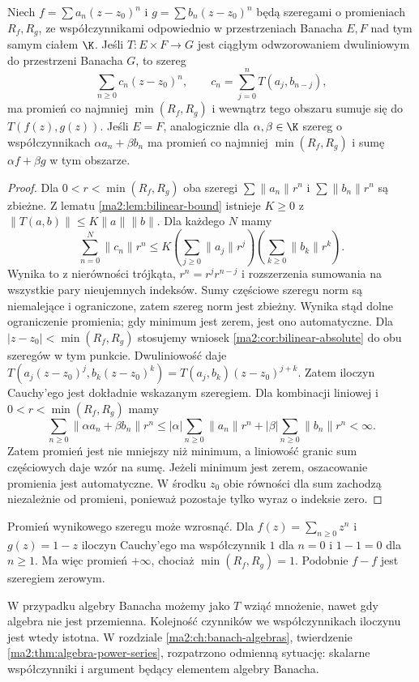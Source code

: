 \begin{twierdzenie}
\label{ma2:thm:power-algebra}
Niech $f=\sum a_n(z-z_0)^n$ i
$g=\sum b_n(z-z_0)^n$ będą szeregami
o promieniach $R_f,R_g$, ze współczynnikami
odpowiednio w przestrzeniach Banacha $E,F$
nad tym samym ciałem $\K$.
Jeśli $T:E\times F\to G$ jest ciągłym
odwzorowaniem dwuliniowym do przestrzeni
Banacha $G$, to szereg
\[
 \sum_{n\ge0}c_n(z-z_0)^n,\qquad
 c_n=\sum_{j=0}^n T(a_j,b_{n-j}),
\]
ma promień co najmniej $\min(R_f,R_g)$
i wewnątrz tego obszaru sumuje się do $T(f(z),g(z))$.
Jeśli $E=F$, analogicznie dla $\alpha,\beta\in\K$
szereg o współczynnikach $\alpha a_n+\beta b_n$
ma promień co najmniej $\min(R_f,R_g)$
i sumę $\alpha f+\beta g$ w tym obszarze.
\end{twierdzenie}
\begin{proof}
Dla $0<r<\min(R_f,R_g)$ oba szeregi
$\sum\|a_n\|r^n$ i $\sum\|b_n\|r^n$ są zbieżne.
Z lematu \ref{ma2:lem:bilinear-bound}
istnieje $K\ge0$ z
$\|T(a,b)\|\le K\|a\|\|b\|$.
Dla każdego $N$ mamy
\[
 \sum_{n=0}^N\|c_n\|r^n
 \le K\left(\sum_{j\ge0}\|a_j\|r^j\right)
      \left(\sum_{k\ge0}\|b_k\|r^k\right).
\]
Wynika to z nierówności trójkąta,
$r^n=r^jr^{n-j}$ i rozszerzenia sumowania
na wszystkie pary nieujemnych indeksów.
Sumy częściowe szeregu norm są niemalejące
i ograniczone, zatem szereg norm jest zbieżny.
Wynika stąd dolne ograniczenie promienia;
gdy minimum jest zerem, jest ono automatyczne.
Dla $|z-z_0|<\min(R_f,R_g)$ stosujemy
wniosek \ref{ma2:cor:bilinear-absolute}
do obu szeregów w tym punkcie.
Dwuliniowość daje
$T(a_j(z-z_0)^j,b_k(z-z_0)^k)
=T(a_j,b_k)(z-z_0)^{j+k}$.
Zatem iloczyn Cauchy'ego jest dokładnie
wskazanym szeregiem. Dla kombinacji liniowej i $0<r<\min(R_f,R_g)$
mamy
\[
 \sum_{n\ge0}\|\alpha a_n+\beta b_n\|r^n
 \le|\alpha|\sum_{n\ge0}\|a_n\|r^n
   +|\beta|\sum_{n\ge0}\|b_n\|r^n<\infty.
\]
Zatem promień jest nie mniejszy niż minimum,
a liniowość granic sum częściowych daje wzór
na sumę. Jeżeli minimum jest zerem, oszacowanie
promienia jest automatyczne. W środku $z_0$
obie równości dla sum zachodzą niezależnie
od promieni, ponieważ pozostaje tylko wyraz
o indeksie zero.
\end{proof}

\begin{przyklad}
\label{ma2:ex:power-cancellation}
Promień wynikowego szeregu może wzrosnąć.
Dla $f(z)=\sum_{n\ge0}z^n$ i $g(z)=1-z$
iloczyn Cauchy'ego ma współczynnik $1$ dla
$n=0$ i $1-1=0$ dla $n\ge1$.
Ma więc promień $+\infty$, chociaż
$\min(R_f,R_g)=1$.
Podobnie $f-f$ jest szeregiem zerowym.
\end{przyklad}
W przypadku algebry Banacha możemy jako $T$
wziąć mnożenie, nawet gdy algebra nie jest
przemienna. Kolejność czynników we współczynnikach
iloczynu jest wtedy istotna. W rozdziale
\ref{ma2:ch:banach-algebras}, twierdzenie
\ref{ma2:thm:algebra-power-series}, rozpatrzono
odmienną sytuację: skalarne współczynniki i argument
będący elementem algebry Banacha.

